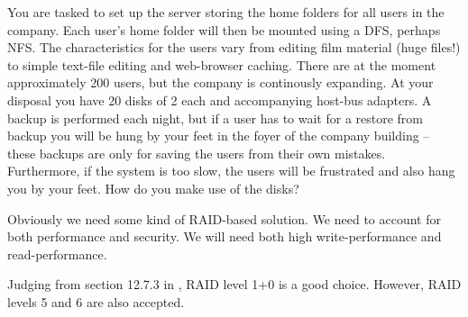 \documentclass[a4paper]{miunasgn}
\begin{document}
\begin{questions}
	\question\label{q:raid}
	You are tasked to set up the server storing the home folders for all users in 
	the company.
	Each user's home folder will then be mounted using a DFS, perhaps NFS.
	The characteristics for the users vary from editing film material (huge 
	files!) to simple text-file editing and web-browser caching.
	There are at the moment approximately 200 users, but the company is 
	continously expanding.
	At your disposal you have 20 disks of \unit{2}{\tera\byte} each and 
	accompanying host-bus adapters.
	A backup is performed each night, but if a user has to wait for a restore 
	from backup you will be hung by your feet in the foyer of the company 
	building -- these backups are only for saving the users from their own 
	mistakes.
	Furthermore, if the system is too slow, the users will be frustrated and also 
	hang you by your feet.
	How do you make use of the disks?
	\begin{solution}
		Obviously we need some kind of RAID-based solution.
		We need to account for both performance and security.
		We will need both high write-performance and read-performance.

		Judging from section 12.7.3 in \cite{Silberschatz2009osc}, RAID level 1+0 
		is a good choice.
		However, RAID levels 5 and 6 are also accepted.
	\end{solution}
\end{questions}





\end{document}
